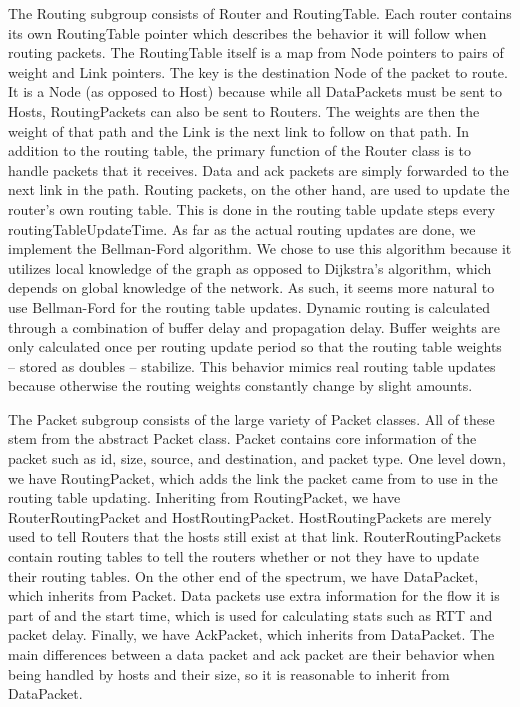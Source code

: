\documentclass{article}
\begin{document}
    The Routing subgroup consists of Router and RoutingTable. Each router contains its own RoutingTable pointer which describes the behavior it will follow when routing packets. The RoutingTable itself is a map from Node pointers to pairs of weight and Link pointers. The key is the destination Node of the packet to route. It is a Node (as opposed to Host) because while all DataPackets must be sent to Hosts, RoutingPackets can also be sent to Routers. The weights are then the weight of that path and the Link is the next link to follow on that path. In addition to the routing table, the primary function of the Router class is to handle packets that it receives. Data and ack packets are simply forwarded to the next link in the path. Routing packets, on the other hand, are used to update the router’s own routing table. This is done in the routing table update steps every routingTableUpdateTime. 
As far as the actual routing updates are done, we implement the Bellman-Ford algorithm. We chose to use this algorithm because it utilizes local knowledge of the graph as opposed to Dijkstra’s algorithm, which depends on global knowledge of the network. As such, it seems more natural to use Bellman-Ford for the routing table updates. Dynamic routing is calculated through a combination of buffer delay and propagation delay. Buffer weights are only calculated once per routing update period so that the routing table weights -- stored as doubles -- stabilize. This behavior mimics real routing table updates because otherwise the routing weights constantly change by slight amounts.

    The Packet subgroup consists of the large variety of Packet classes. All of these stem from the abstract Packet class. Packet contains core information of the packet such as id, size, source, and destination, and packet type. One level down, we have RoutingPacket, which adds the link the packet came from to use in the routing table updating. Inheriting from RoutingPacket, we have RouterRoutingPacket and HostRoutingPacket. HostRoutingPackets are merely used to tell Routers that the hosts still exist at that link. RouterRoutingPackets contain routing tables to tell the routers whether or not they have to update their routing tables. On the other end of the spectrum, we have DataPacket, which inherits from Packet. Data packets use extra information for the flow it is part of and the start time, which is used for calculating stats such as RTT and packet delay. Finally, we have AckPacket, which inherits from DataPacket. The main differences between a data packet and ack packet are their behavior when being handled by hosts and their size, so it is reasonable to inherit from DataPacket.
\end{document}
